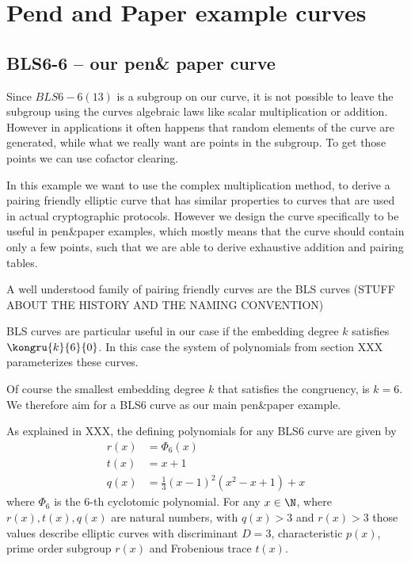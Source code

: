 \section{Pend and Paper example curves}
\subsection{BLS6-6 -- our pen\& paper curve}

\begin{definition}
Since $BLS6-6(13)$ is a subgroup on our curve, it is not possible to leave the subgroup using the curves algebraic laws like scalar multiplication or addition. However in applications it often happens that random elements of the curve are generated, while what we really want are points in the subgroup. To get those points we can use cofactor clearing.
\end{definition}

In this example we want to use the complex multiplication method, to derive a pairing friendly elliptic curve that has similar properties to curves that are used in actual cryptographic protocols. However we design the curve specifically to be useful in pen\&{}paper examples, which mostly means that the curve should contain only a few points, such that we are able to derive exhaustive addition and pairing tables.

A well understood family of pairing friendly curves are the BLS curves (STUFF ABOUT THE HISTORY AND THE NAMING CONVENTION)

BLS curves are particular useful in our case if the embedding degree $k$ satisfies $\kongru{k}{6}{0}$. In this case the system of polynomials from section XXX parameterizes these curves.

Of course the smallest embedding degree $k$ that satisfies the congruency, is $k=6$. We therefore aim for a BLS6 curve as our main pen\&{}paper example. 

As explained in XXX, the defining polynomials for any BLS6 curve are given by
\begin{align*}
r(x) &= \Phi_6(x)\\
t(x) &= x+1\\
q(x) &= \frac{1}{3}(x-1)^2(x^{2}-x+1) +x
\end{align*}
where $\Phi_6$ is the $6$-th cyclotomic polynomial. For any $x\in\N$, where $r(x),t(x),q(x)$ are natural numbers, with $q(x)>3$ and $r(x)>3$ those values describe elliptic curves with discriminant $D=3$, characteristic $p(x)$, prime order subgroup $r(x)$ and Frobenious trace $t(x)$.  

